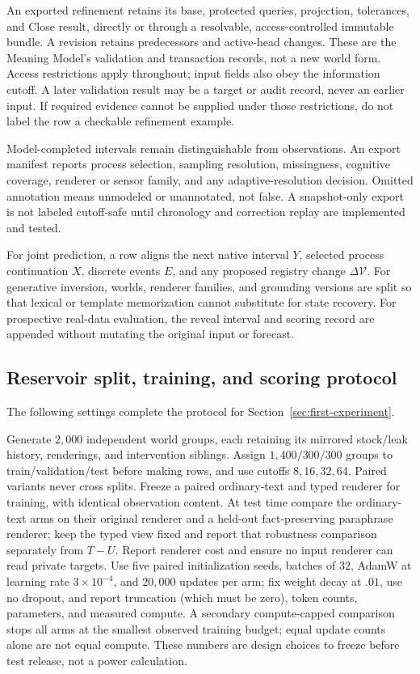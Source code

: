 \documentclass[10pt]{article}
\begin{document}
An exported refinement retains its base, protected queries, projection,
tolerances, and Close result, directly or through a resolvable, access-controlled
immutable bundle. A revision retains predecessors and active-head changes.
These are the Meaning Model's validation and transaction records, not a new
world form. Access restrictions apply throughout; input fields also obey the
information cutoff. A later validation result may be a target or audit record, never an earlier
input. If required evidence cannot be supplied under those restrictions, do
not label the row a checkable refinement example.

Model-completed intervals remain distinguishable from observations. An export
manifest reports process selection, sampling resolution, missingness, cognitive
coverage, renderer or sensor family, and any adaptive-resolution decision.
Omitted annotation means unmodeled or unannotated, not false. A snapshot-only
export is not labeled cutoff-safe until chronology and correction replay are
implemented and tested.

For joint prediction, a row aligns the next native interval $Y$, selected
process continuation $X$, discrete events $E$, and any proposed registry change
$\Delta\mathcal V$. For generative inversion, worlds, renderer families, and
grounding versions are split so that lexical or template memorization cannot
substitute for state recovery. For prospective real-data evaluation, the reveal
interval and scoring record are appended without mutating the original input or
forecast.

\subsection{Reservoir split, training, and scoring protocol}
\label{app:reservoir-protocol}

The following settings complete the protocol for
Section~\ref{sec:first-experiment}.

Generate $2{,}000$ independent world groups, each retaining its mirrored
stock/leak history, renderings, and intervention siblings. Assign
$1{,}400/300/300$ groups to train/validation/test before making rows, and use
cutoffs $8,16,32,64$. Paired variants never cross splits. Freeze a paired
ordinary-text and typed renderer for training, with identical observation
content. At test time compare the ordinary-text arms on their original
renderer and a held-out fact-preserving paraphrase renderer; keep the typed
view fixed and report that robustness comparison separately from $T-U$.
Report renderer cost and ensure no input renderer can read private targets.
Use five paired initialization seeds, batches of
$32$, AdamW at learning rate $3\times10^{-4}$, and $20{,}000$ updates per arm;
fix weight decay at $.01$, use no dropout, and report truncation (which must
be zero), token counts, parameters, and measured compute. A secondary
compute-capped comparison stops all arms at the smallest observed training
budget; equal update counts alone are not equal compute. These numbers are
design choices to freeze before test release, not a power calculation.
\end{document}
